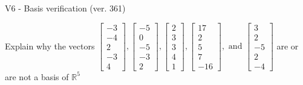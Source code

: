 \begin{exercise}
  \begin{exerciseTitle}V6 - Basis verification (ver. 361)\end{exerciseTitle}
  \begin{exerciseStatement}
    Explain why the vectors \(\left[\begin{array}{r}
-3 \\
-4 \\
2 \\
-3 \\
4
\end{array}\right] , \left[\begin{array}{r}
-5 \\
0 \\
-5 \\
-3 \\
2
\end{array}\right] , \left[\begin{array}{r}
2 \\
3 \\
3 \\
4 \\
1
\end{array}\right] , \left[\begin{array}{r}
17 \\
2 \\
5 \\
7 \\
-16
\end{array}\right] , \text{ and } \left[\begin{array}{r}
3 \\
2 \\
-5 \\
2 \\
-4
\end{array}\right]\) are or are not a basis of \(\mathbb{R}^5\)	



\end{exerciseStatement}
\end{exercise}
